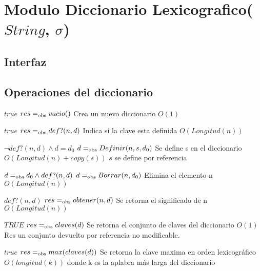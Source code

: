 \section{Modulo Diccionario Lexicografico($String$, $\sigma$)}

\subsection{Interfaz}


  \subsection*{Operaciones del diccionario}

 {$true$}
 {$res =_{\mathrm{obs}} vacio()$}
 {Crea un nuevo diccionario}
 {$O(1)$}
 {}

 
  {$true$}
  {$res =_{\mathrm{obs}} def?(n,d)$}
  {Indica si la clave esta definida}
  {$O(Longitud(n))$}
  {}

  {$\neg def?(n,d) \land d=d_0$}
  {$d =_{\mathrm{obs}} Definir(n, s, d_0)$}
  {Se define s en el diccionario}
  {$O(Longitud(n)+copy(s))$}
  {$s$ se define por referencia}

 {$d =_{\mathrm{obs}} d_0 \land def?(n,d)$}
 {$d =_{\mathrm{obs}} Borrar(n,d_0)$}
 {Elimina el elemento n}
 {$O(Longitud(n))$}
 {}

 {$def?(n,d)$}
 {$res =_{\mathrm{obs}} obtener(n,d)$}
 {Se retorna el significado de n}
 {$O(Longitud(n))$}
 {}
 
 {$TRUE$}
 {$res =_{\mathrm{obs}} claves(d)$}
 {Se retorna el conjunto de claves del diccionario}
 {$O(1)$}
 {Res un conjunto devuelto por referencia no modificable. }
 
 {$true$}
 {$res =_{\mathrm{obs}} max(claves(d))$}
 {Se retorna la clave maxima en orden lexicográfico}
 {$O(longitud(k))$ donde k es la aplabra más larga del diccionario}
 {}
 
